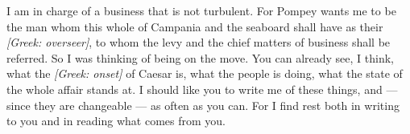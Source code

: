  I am in charge of a business that is not turbulent. For Pompey wants me to be the man whom this whole of Campania and the seaboard shall have as their \textit{[Greek: overseer]}, to whom the levy and the chief matters of business shall be referred. So I was thinking of being on the move. You can already see, I think, what the \textit{[Greek: onset]} of Caesar is, what the people is doing, what the state of the whole affair stands at. I should like you to write me of these things, and --- since they are changeable --- as often as you can. For I find rest both in writing to you and in reading what comes from you.
